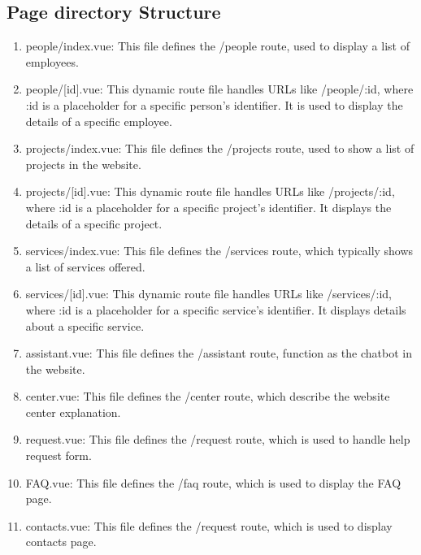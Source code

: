 \subsection{Page directory Structure}
\begin{enumerate}
	\item people/index.vue: This file defines the /people route, used to display a list of employees.
	\item people/[id].vue: This dynamic route file handles URLs like /people/:id, where :id is a placeholder for a specific person's identifier. It is used to display the details of a specific employee.
	\item projects/index.vue: This file defines the /projects route, used to show a list of projects in the website.
	\item projects/[id].vue: This dynamic route file handles URLs like /projects/:id, where :id is a placeholder for a specific project's identifier. It displays the details of a specific project.
	\item services/index.vue: This file defines the /services route, which typically shows a list of services offered.
	\item services/[id].vue: This dynamic route file handles URLs like /services/:id, where :id is a placeholder for a specific service's identifier. It displays details about a specific service.
	\item assistant.vue: This file defines the /assistant route, function as the chatbot in the website.
	\item center.vue: This file defines the /center route, which describe the website center explanation.
	\item request.vue: This file defines the /request route, which is used to handle help request form.
	\item FAQ.vue: This file defines the /faq route, which is used to display the FAQ page.
	\item contacts.vue: This file defines the /request route, which is used to display contacts page.
	
\end{enumerate}

